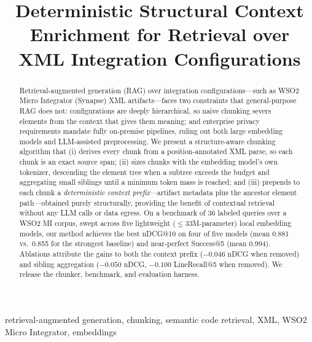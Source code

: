 \documentclass[conference]{IEEEtran}
\begin{document}
\title{Deterministic Structural Context Enrichment for Retrieval over XML Integration Configurations}

\author{
}

\maketitle

\begin{abstract}
Retrieval-augmented generation (RAG) over integration configurations---such as WSO2 Micro Integrator (Synapse) XML artifacts---faces two constraints that general-purpose RAG does not: configurations are deeply hierarchical, so naive chunking severs elements from the context that gives them meaning; and enterprise privacy requirements mandate fully on-premise pipelines, ruling out both large embedding models and LLM-assisted preprocessing. We present a structure-aware chunking algorithm that (i) derives every chunk from a position-annotated XML parse, so each chunk is an exact source span; (ii) sizes chunks with the embedding model's own tokenizer, descending the element tree when a subtree exceeds the budget and aggregating small siblings until a minimum token mass is reached; and (iii) prepends to each chunk a \emph{deterministic context prefix}---artifact metadata plus the ancestor element path---obtained purely structurally, providing the benefit of contextual retrieval without any LLM calls or data egress. On a benchmark of 36 labeled queries over a WSO2 MI corpus, swept across five lightweight ($\leq$33M-parameter) local embedding models, our method achieves the best nDCG@10 on four of five models (mean 0.881 vs.\ 0.855 for the strongest baseline) and near-perfect Success@5 (mean 0.994). Ablations attribute the gains to both the context prefix ($-0.046$ nDCG when removed) and sibling aggregation ($-0.050$ nDCG, $-0.100$ LineRecall@5 when removed). We release the chunker, benchmark, and evaluation harness.
\end{abstract}

\begin{IEEEkeywords}
retrieval-augmented generation, chunking, semantic code retrieval, XML, WSO2 Micro Integrator, embeddings
\end{IEEEkeywords}
\end{document}
